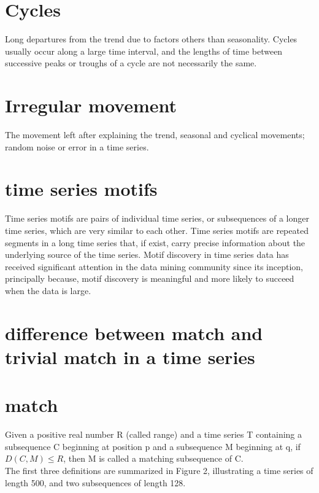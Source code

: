 \documentclass[12pt,a4paper]{article}
\begin{document}
	\section*{Cycles}
	Long departures from the trend due to factors others than seasonality. Cycles usually occur along a large time interval, and the lengths of time between successive peaks or troughs of a cycle are not necessarily the same.
	\section*{Irregular movement}
	The movement left after explaining the trend, seasonal and cyclical movements; random noise or error in a time series.
	\section*{time series motifs}
	Time series motifs are pairs of individual time series, or subsequences of a longer time series, which are very similar to each other.
Time series motifs are repeated segments in a long time series that, if exist, carry precise information about the underlying source of the time series. Motif discovery in time series data has received significant attention in the data mining community since its inception, principally because, motif discovery is meaningful and more likely to succeed when the data is large.
	\section{difference between match and trivial match in a time series}
	\section*{match}
	Given a positive real number R (called range) and a time series T containing a subsequence C beginning at position p and a subsequence M beginning at q, if $D(C, M) \leq R$, then M is called a matching subsequence of C.
	\\ The first three definitions are summarized in Figure 2, illustrating a time series of length 500, and two subsequences of length 128.
\end{document}
